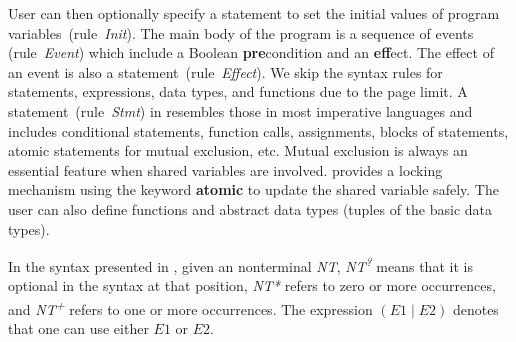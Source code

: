 User can then optionally specify a statement to set the initial values of program variables~(rule~\emph{Init}).
The main body of the program is a sequence of events (rule~\emph{Event}) which include a Boolean \textbf{pre}condition
and an \textbf{eff}ect.
The effect of an event is also a statement~(rule~\emph{Effect}).
We skip the syntax rules for statements, expressions, data types, and functions due to the page limit.
A statement~(rule~\emph{Stmt}) in \lgname resembles those in most imperative languages and includes
conditional statements, function calls, assignments, blocks of statements, atomic statements for mutual exclusion, etc.
Mutual exclusion is always an essential feature when shared variables are involved.
\lgname provides a locking mechanism using the keyword \textbf{atomic} to update the shared variable safely.
The user can also define functions and abstract data types (tuples of the basic data types).

In the syntax presented in , given an nonterminal \textit{NT},
{\it NT\textsuperscript{?}} means that it is optional in the syntax at that position,
{\it NT*} refers to zero or more occurrences,
and {\it NT\textsuperscript{+}} refers to one or more occurrences.
The expression $(E1\mid E2)$ denotes that one can use either $E1$ or $E2$.

